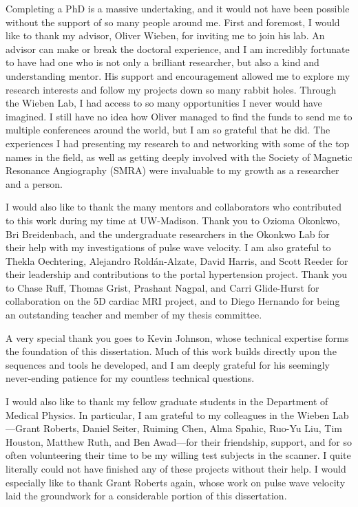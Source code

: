 Completing a PhD is a massive undertaking, and it would not have been possible without the support of so many people around me. First and foremost, I would like to thank my advisor, Oliver Wieben, for inviting me to join his lab. An advisor can make or break the doctoral experience, and I am incredibly fortunate to have had one who is not only a brilliant researcher, but also a kind and understanding mentor. His support and encouragement allowed me to explore my research interests and follow my projects down so many rabbit holes. Through the Wieben Lab, I had access to so many opportunities I never would have imagined. I still have no idea how Oliver managed to find the funds to send me to multiple conferences around the world, but I am so grateful that he did. The experiences I had presenting my research to and networking with some of the top names in the field, as well as getting deeply involved with the Society of Magnetic Resonance Angiography (SMRA) were invaluable to my growth as a researcher and a person.

I would also like to thank the many mentors and collaborators who contributed to this work during my time at UW-Madison. Thank you to Ozioma Okonkwo, Bri Breidenbach, and the undergraduate researchers in the Okonkwo Lab for their help with my investigations of pulse wave velocity. I am also grateful to Thekla Oechtering, Alejandro Roldán-Alzate, David Harris, and Scott Reeder for their leadership and contributions to the portal hypertension project. Thank you to Chase Ruff, Thomas Grist, Prashant Nagpal, and Carri Glide-Hurst for collaboration on the 5D cardiac MRI project, and to Diego Hernando for being an outstanding teacher and member of my thesis committee.

A very special thank you goes to Kevin Johnson, whose technical expertise forms the foundation of this dissertation. Much of this work builds directly upon the sequences and tools he developed, and I am deeply grateful for his seemingly never-ending patience for my countless technical questions.

I would also like to thank my fellow graduate students in the Department of Medical Physics. In particular, I am grateful to my colleagues in the Wieben Lab---Grant Roberts, Daniel Seiter, Ruiming Chen, Alma Spahic, Ruo-Yu Liu, Tim Houston, Matthew Ruth, and Ben Awad---for their friendship, support, and for so often volunteering their time to be my willing test subjects in the scanner. I quite literally could not have finished any of these projects without their help. I would especially like to thank Grant Roberts again, whose work on pulse wave velocity laid the groundwork for a considerable portion of this dissertation.

